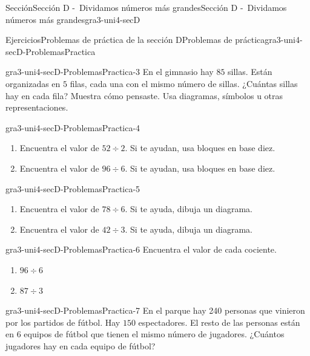 \documentclass[twoside,10pt,]{article}
\begin{document}
\begin{sectionptx}{Sección}{Sección D -~Dividamos números más grandes}{}{Sección D -~Dividamos números más grandes}{}{}{gra3-uni4-secD}
\typeout{************************************************}
%
\begin{exercises-subsection}{Ejercicios}{Problemas de práctica de la sección D}{}{Problemas de práctica}{}{}{gra3-uni4-secD-ProblemasPractica}
\begin{divisionexercise}{1}{}{}{gra3-uni4-secD-ProblemasPractica-3}%
En el gimnasio hay \(85\) sillas. Están organizadas en \(5\) filas, cada una con el mismo número de sillas. ¿Cuántas sillas hay en cada fila? Muestra cómo pensaste. Usa diagramas, símbolos u otras representaciones.%
\end{divisionexercise}%
\begin{divisionexercise}{2}{}{}{gra3-uni4-secD-ProblemasPractica-4}%
%
\begin{enumerate}[label={(\alph*)}]
\item{}Encuentra el valor de \(52 \div 2\). Si te ayudan, usa bloques en base diez.%
\item{}Encuentra el valor de \(96 \div 6\). Si te ayudan, usa bloques en base diez.%
\end{enumerate}
\end{divisionexercise}%
\begin{divisionexercise}{3}{}{}{gra3-uni4-secD-ProblemasPractica-5}%
%
\begin{enumerate}[label={(\alph*)}]
\item{}Encuentra el valor de \(78 \div 6\). Si te ayuda, dibuja un diagrama.%
\item{}Encuentra el valor de \(42 \div 3\). Si te ayuda, dibuja un diagrama.%
\end{enumerate}
\end{divisionexercise}%
\begin{divisionexercise}{4}{}{}{gra3-uni4-secD-ProblemasPractica-6}%
Encuentra el valor de cada cociente.%
%
\begin{enumerate}[label={(\alph*)}]
\item{}\(\displaystyle 96 \div 6\)%
\item{}\(\displaystyle 87 \div 3\)%
\end{enumerate}
\end{divisionexercise}%
\begin{divisionexercise}{5}{}{}{gra3-uni4-secD-ProblemasPractica-7}%
En el parque hay 240 personas que vinieron por los partidos de fútbol. Hay \(150\) espectadores. El resto de las personas están en \(6\) equipos de fútbol que tienen el mismo número de jugadores. ¿Cuántos jugadores hay en cada equipo de fútbol?%

\end{divisionexercise}
\end{exercises-subsection}
\end{sectionptx}
\end{document}
